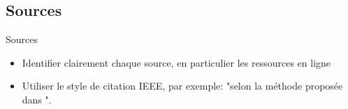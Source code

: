 \subsection{Sources}
\label{sec:Sources}

\begin{frame}[c]{Sources}
    \begin{itemize}
        \item Identifier clairement chaque source, en particulier les ressources en ligne
        \item Utiliser le style de citation IEEE, par exemple: "selon la méthode proposée dans \cite{ECARNOT2015573}".
    \end{itemize}
    \nocite{*}
    \printbibliography
\end{frame}